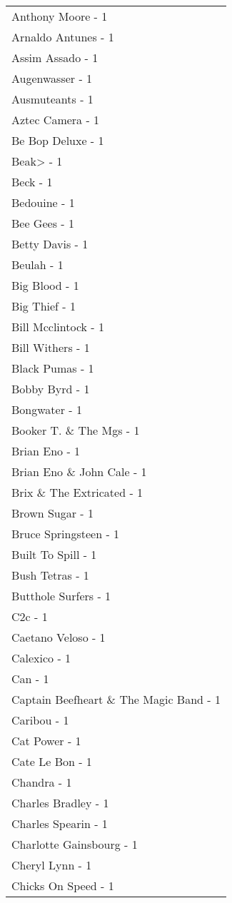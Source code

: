 \documentclass[
]{article}
\begin{document}
\begin{longtable}{l}
Anthony Moore - 1 \\ 
Arnaldo Antunes - 1 \\ 
Assim Assado - 1 \\ 
Augenwasser - 1 \\ 
Ausmuteants - 1 \\ 
Aztec Camera - 1 \\ 
Be Bop Deluxe - 1 \\ 
Beak> - 1 \\ 
Beck - 1 \\ 
Bedouine - 1 \\ 
Bee Gees - 1 \\ 
Betty Davis - 1 \\ 
Beulah - 1 \\ 
Big Blood - 1 \\ 
Big Thief - 1 \\ 
Bill Mcclintock - 1 \\ 
Bill Withers - 1 \\ 
Black Pumas - 1 \\ 
Bobby Byrd - 1 \\ 
Bongwater - 1 \\ 
Booker T. \& The Mgs - 1 \\ 
Brian Eno - 1 \\ 
Brian Eno \& John Cale - 1 \\ 
Brix \& The Extricated - 1 \\ 
Brown Sugar - 1 \\ 
Bruce Springsteen - 1 \\ 
Built To Spill - 1 \\ 
Bush Tetras - 1 \\ 
Butthole Surfers - 1 \\ 
C2c - 1 \\ 
Caetano Veloso - 1 \\ 
Calexico - 1 \\ 
Can - 1 \\ 
Captain Beefheart \& The Magic Band - 1 \\ 
Caribou - 1 \\ 
Cat Power - 1 \\ 
Cate Le Bon - 1 \\ 
Chandra - 1 \\ 
Charles Bradley - 1 \\ 
Charles Spearin - 1 \\ 
Charlotte Gainsbourg - 1 \\ 
Cheryl Lynn - 1 \\ 
Chicks On Speed - 1 \\ 

\end{longtable}
\end{document}

